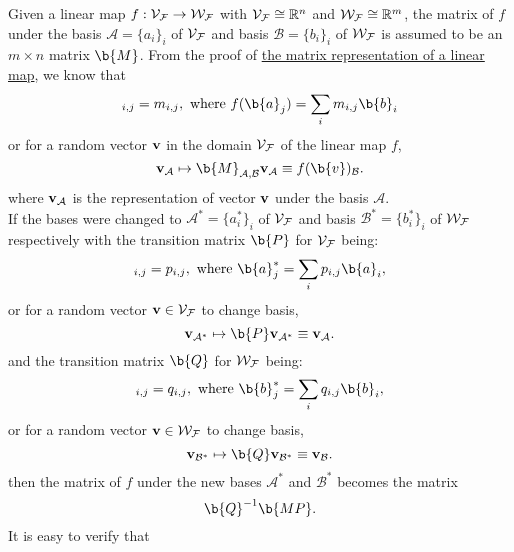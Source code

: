 \begin{corollary} \label{change_of_basis}
    Given a linear map $f: \mathcal{V}_{\mathcal{F}} \to \mathcal{W}_{\mathcal{F}}$ with $\mathcal{V}_{\mathcal{F}} \cong \mathbb{R}^{n}$ and $\mathcal{W}_{\mathcal{F}} \cong \mathbb{R}^{m}$, the matrix of $f$ under the basis $\mathcal{A} = \{a_i\}_i$ of $\mathcal{V}_{\mathcal{F}}$ and basis $\mathcal{B} = \{b_i\}_i$ of $\mathcal{W}_{\mathcal{F}}$ is assumed to be an ${m \times n}$ matrix $\b{M}$. 
    From the proof of \hyperref[matrix of a linear map]{the matrix representation of a linear map}, we know that 
    \begin{equation*}
        [\b{M}]_{i,j} = m_{i,j}, \textnormal{ where } f(\b{a}_j) = \sum_i m_{i,j} \b{b}_i
    \end{equation*}
    or for a random vector $\mathbf{v}$ in the domain $\mathcal{V}_{\mathcal{F}}$ of the linear map $f$,
    \begin{equation*}
        \vv_{\mathcal{A}} \mapsto \b{M}_{\mathcal{A,B}}\vv_{\mathcal{A}} \equiv f(\b{v})_{\mathcal{B}}.
    \end{equation*}
    where $\mathbf{v}_{\mathcal{A}}$ is the representation of vector $\mathbf{v}$ under the basis $\mathcal{A}$.\\
    If the bases were changed to $\mathcal{A^*} = \{a_i^*\}_i$ of $\mathcal{V}_{\mathcal{F}}$ and basis $\mathcal{B^*} = \{b_i^*\}_i$ of $\mathcal{W}_{\mathcal{F}}$ respectively with the transition matrix $\b{P}$ for $\mathcal{V}_{\mathcal{F}}$ being:
    \begin{equation*}
        [\b{P}]_{i,j} = p_{i,j}, \textnormal{ where } \b{a}_j^* = \sum_i p_{i,j} \b{a}_i,
    \end{equation*}
    or for a random vector $\mathbf{v} \in \mathcal{V}_{\mathcal{F}}$ to change basis,
    \begin{equation*}
        \vv_{\mathcal{A^*}} \mapsto \b{P}\vv_{\mathcal{A^*}} \equiv \vv_{\mathcal{A}}.
    \end{equation*}
    and the transition matrix $\b{Q}$ for $\mathcal{W}_{\mathcal{F}}$ being:
    \begin{equation*}
        [\b{Q}]_{i,j} = q_{i,j}, \textnormal{ where } \b{b}_j^* = \sum_i q_{i,j} \b{b}_i,
    \end{equation*}
    or for a random vector $\mathbf{v} \in \mathcal{W}_{\mathcal{F}}$ to change basis,
    \begin{equation*}
        \vv_{\mathcal{B^*}} \mapsto \b{Q}\vv_{\mathcal{B^*}} \equiv \vv_{\mathcal{B}}.
    \end{equation*}
    then the matrix of $f$ under the new bases $\mathcal{A^*}$ and $\mathcal{B^*}$ becomes the matrix $$\b{Q}^{-1}\b{MP}.$$
    It is easy to verify that 
    \begin{equation*}

\end{equation*}
\end{corollary}
